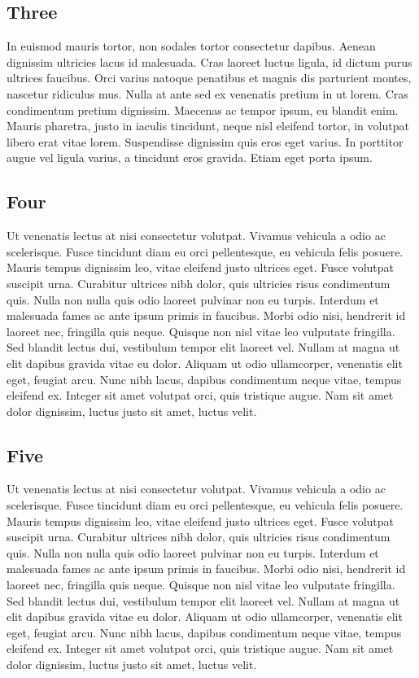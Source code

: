 \begin{spacing}{2.0}
\section{Three}
In euismod mauris tortor, non sodales tortor consectetur dapibus. Aenean dignissim ultricies lacus id malesuada. Cras laoreet luctus ligula, id dictum purus ultrices faucibus. Orci varius natoque penatibus et magnis dis parturient montes, nascetur ridiculus mus. Nulla at ante sed ex venenatis pretium in ut lorem. Cras condimentum pretium dignissim. Maecenas ac tempor ipsum, eu blandit enim. Mauris pharetra, justo in iaculis tincidunt, neque nisl eleifend tortor, in volutpat libero erat vitae lorem. Suspendisse dignissim quis eros eget varius. In porttitor augue vel ligula varius, a tincidunt eros gravida. Etiam eget porta ipsum.


\subsection{Four}

Ut venenatis lectus at nisi consectetur volutpat. Vivamus vehicula a odio ac scelerisque. Fusce tincidunt diam eu orci pellentesque, eu vehicula felis posuere. Mauris tempus dignissim leo, vitae eleifend justo ultrices eget. Fusce volutpat suscipit urna. Curabitur ultrices nibh dolor, quis ultricies risus condimentum quis. Nulla non nulla quis odio laoreet pulvinar non eu turpis. Interdum et malesuada fames ac ante ipsum primis in faucibus. Morbi odio nisi, hendrerit id laoreet nec, fringilla quis neque. Quisque non nisl vitae leo vulputate fringilla. Sed blandit lectus dui, vestibulum tempor elit laoreet vel. Nullam at magna ut elit dapibus gravida vitae eu dolor. Aliquam ut odio ullamcorper, venenatis elit eget, feugiat arcu. Nunc nibh lacus, dapibus condimentum neque vitae, tempus eleifend ex. Integer sit amet volutpat orci, quis tristique augue. Nam sit amet dolor dignissim, luctus justo sit amet, luctus velit.

\subsection{Five}

Ut venenatis lectus at nisi consectetur volutpat. Vivamus vehicula a odio ac scelerisque. Fusce tincidunt diam eu orci pellentesque, eu vehicula felis posuere. Mauris tempus dignissim leo, vitae eleifend justo ultrices eget. Fusce volutpat suscipit urna. Curabitur ultrices nibh dolor, quis ultricies risus condimentum quis. Nulla non nulla quis odio laoreet pulvinar non eu turpis. Interdum et malesuada fames ac ante ipsum primis in faucibus. Morbi odio nisi, hendrerit id laoreet nec, fringilla quis neque. Quisque non nisl vitae leo vulputate fringilla. Sed blandit lectus dui, vestibulum tempor elit laoreet vel. Nullam at magna ut elit dapibus gravida vitae eu dolor. Aliquam ut odio ullamcorper, venenatis elit eget, feugiat arcu. Nunc nibh lacus, dapibus condimentum neque vitae, tempus eleifend ex. Integer sit amet volutpat orci, quis tristique augue. Nam sit amet dolor dignissim, luctus justo sit amet, luctus velit.


\end{spacing}
\newpage
